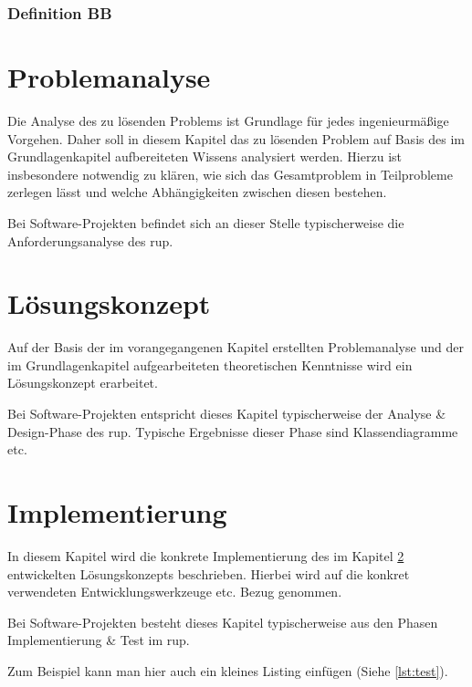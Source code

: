 \documentclass[oneside]{ausarbeitung}
\begin{document}
\blindtext

\subsection{Definition BB}
\label{sub:definitionbb}

\blindtext

\chapter{Problemanalyse}
\label{cha:problemanalyse}

Die Analyse des zu lösenden Problems ist Grundlage für jedes
ingenieurmäßige Vorgehen. Daher soll in diesem Kapitel das zu lösenden
Problem auf Basis des im Grundlagenkapitel aufbereiteten Wissens
analysiert werden. Hierzu ist insbesondere notwendig zu klären, wie sich
das Gesamtproblem in Teilprobleme zerlegen lässt und welche
Abhängigkeiten zwischen diesen bestehen.

Bei Software-Projekten befindet sich an dieser Stelle typischerweise die
Anforderungsanalyse des \ac{rup}.

\chapter{Lösungskonzept}
\label{cha:loesungskonzept}

Auf der Basis der im vorangegangenen Kapitel erstellten Problemanalyse
und der im Grundlagenkapitel aufgearbeiteten theoretischen Kenntnisse
wird ein Lösungskonzept erarbeitet.

Bei Software-Projekten entspricht dieses Kapitel typischerweise der
Analyse \& Design-Phase des \ac{rup}. Typische Ergebnisse dieser Phase sind
Klassendiagramme etc.

\chapter{Implementierung}
\label{cha:implementierung}

In diesem Kapitel wird die konkrete Implementierung des im Kapitel
\ref{cha:loesungskonzept} entwickelten Lösungskonzepts beschrieben.
Hierbei wird auf die konkret verwendeten Entwicklungswerkzeuge etc.
Bezug genommen.

Bei Software-Projekten besteht dieses Kapitel typischerweise aus den
Phasen Implementierung \& Test im \ac{rup}.

Zum Beispiel kann man hier auch ein kleines Listing einfügen (Siehe \ref{lst:test}).
\end{document}

